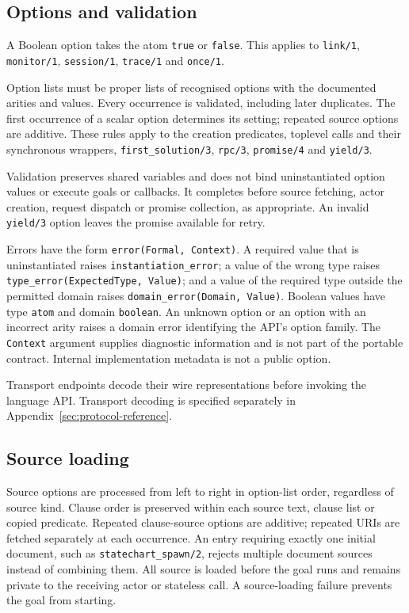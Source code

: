 \subsection{Options and validation}\label{sec:manual-options}
A Boolean option takes the atom \texttt{true} or \texttt{false}. This applies
to \texttt{link/1}, \texttt{monitor/1}, \texttt{session/1}, \texttt{trace/1}
and \texttt{once/1}.

Option lists must be proper lists of recognised options with the documented
arities and values. Every occurrence is validated, including later duplicates.
The first occurrence of a scalar option determines its setting; repeated
source options are additive. These rules apply to the creation predicates,
toplevel calls and their synchronous wrappers,
\texttt{first\_\allowbreak{}solution/\allowbreak{}3},
\texttt{rpc/\allowbreak{}3}, \texttt{promise/\allowbreak{}4} and
\texttt{yield/\allowbreak{}3}.

Validation preserves shared variables and does not bind uninstantiated option
values or execute goals or callbacks. It completes before source fetching,
actor creation, request dispatch or promise collection, as appropriate.
An invalid \texttt{yield/\allowbreak{}3} option leaves the promise available
for retry.

Errors have the form \texttt{error(Formal, Context)}. A required value that is
uninstantiated raises \texttt{instantiation\_error}; a value of the wrong type
raises \texttt{type\_error(ExpectedType, Value)}; and a value of the required
type outside the permitted domain raises
\texttt{domain\_error(Domain, Value)}. Boolean values have type \texttt{atom}
and domain \texttt{boolean}. An unknown option or an option with an incorrect
arity raises a domain error identifying the API's option family. The
\texttt{Context} argument supplies diagnostic information and is not part of
the portable contract. Internal implementation metadata is not a public option.

Transport endpoints decode their wire representations before invoking the
language API. Transport decoding is specified separately in
Appendix~\ref{sec:protocol-reference}.

\subsection{Source loading}\label{sec:manual-sources}
Source options are processed from left to right in option-list order,
regardless of source kind. Clause order is preserved within each source text,
clause list or copied predicate. Repeated clause-source options are additive;
repeated URIs are fetched separately at each occurrence. An entry requiring
exactly one initial document, such as \texttt{statechart\_spawn/2}, rejects
multiple document sources instead of combining them. All source is loaded
before the goal runs and remains private to the receiving actor or stateless
call. A source-loading failure prevents the goal from starting.

